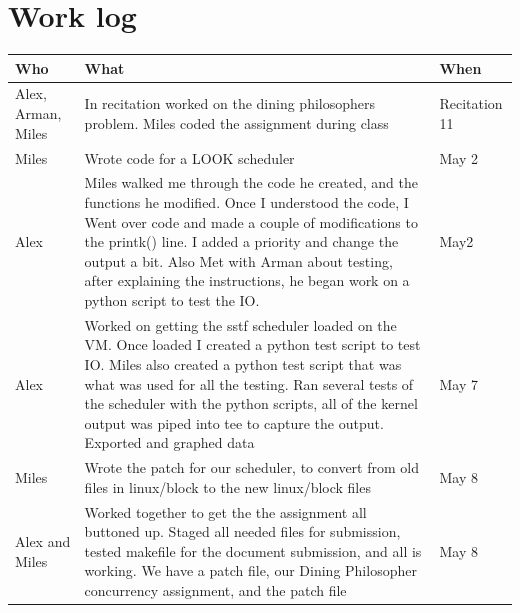 \documentclass[letterpaper,10pt,draftclsnofoot,onecolumn]{IEEEtran}
\begin{document}
\section{Work log}
\begin{tabular}{| p{2.1in} | p{2.3in} | p{2.1in} |}
\hline
Who & What & When \\
\hline
Alex, Arman, Miles & In recitation worked on the dining philosophers problem. Miles coded the assignment during class  & Recitation 11\\
\hline
Miles & Wrote code for a LOOK scheduler & May 2\\
\hline
Alex & Miles walked me through the code he created, and the functions he modified. Once I understood the code, I Went over code and made a couple of modifications to the printk() line. I added a priority and change the output a bit. Also Met with Arman about testing, after explaining the instructions, he began work on a python script to test the IO. & May2\\
\hline
Alex & Worked on getting the sstf scheduler loaded on the VM. Once loaded I created a python test script to test IO. Miles also created a python test script that was what was used for all the testing. Ran several tests of the scheduler with the python scripts, all of the kernel output was piped into tee to capture the output. Exported and graphed data & May 7\\
\hline
Miles & Wrote the patch for our scheduler, to convert from old files in linux/block to the new linux/block files & May 8\\
\hline
Alex and Miles & Worked together to get the the assignment all buttoned up. Staged all needed files for submission, tested makefile for the document submission, and all is working. We have a patch file, our Dining Philosopher concurrency assignment, and the patch file & May 8\\
\hline


\end{tabular}
%
%

%
\end{document}
